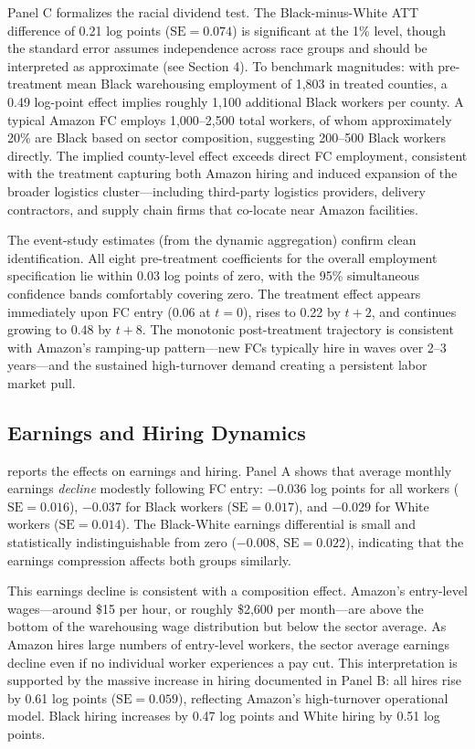 \documentclass[12pt]{article}
\begin{document}
Panel C formalizes the racial dividend test. The Black-minus-White ATT difference of 0.21 log points ($\text{SE} = 0.074$) is significant at the 1\% level, though the standard error assumes independence across race groups and should be interpreted as approximate (see Section 4). To benchmark magnitudes: with pre-treatment mean Black warehousing employment of 1,803 in treated counties, a 0.49 log-point effect implies roughly 1,100 additional Black workers per county. A typical Amazon FC employs 1,000--2,500 total workers, of whom approximately 20\% are Black based on sector composition, suggesting 200--500 Black workers directly. The implied county-level effect exceeds direct FC employment, consistent with the treatment capturing both Amazon hiring and induced expansion of the broader logistics cluster---including third-party logistics providers, delivery contractors, and supply chain firms that co-locate near Amazon facilities.

The event-study estimates (from the dynamic aggregation) confirm clean identification. All eight pre-treatment coefficients for the overall employment specification lie within 0.03 log points of zero, with the 95\% simultaneous confidence bands comfortably covering zero. The treatment effect appears immediately upon FC entry (0.06 at $t=0$), rises to 0.22 by $t+2$, and continues growing to 0.48 by $t+8$. The monotonic post-treatment trajectory is consistent with Amazon's ramping-up pattern---new FCs typically hire in waves over 2--3 years---and the sustained high-turnover demand creating a persistent labor market pull.


\subsection{Earnings and Hiring Dynamics}



 reports the effects on earnings and hiring. Panel A shows that average monthly earnings \textit{decline} modestly following FC entry: $-0.036$ log points for all workers ($\text{SE} = 0.016$), $-0.037$ for Black workers ($\text{SE} = 0.017$), and $-0.029$ for White workers ($\text{SE} = 0.014$). The Black-White earnings differential is small and statistically indistinguishable from zero ($-0.008$, $\text{SE} = 0.022$), indicating that the earnings compression affects both groups similarly.

This earnings decline is consistent with a composition effect. Amazon's entry-level wages---around \$15 per hour, or roughly \$2,600 per month---are above the bottom of the warehousing wage distribution but below the sector average. As Amazon hires large numbers of entry-level workers, the sector average earnings decline even if no individual worker experiences a pay cut. This interpretation is supported by the massive increase in hiring documented in Panel B: all hires rise by 0.61 log points ($\text{SE} = 0.059$), reflecting Amazon's high-turnover operational model. Black hiring increases by 0.47 log points and White hiring by 0.51 log points.
\end{document}
